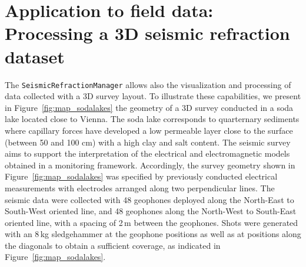 \documentclass[a4paper,fleqn]{cas-sc}
\begin{document}

\section{Application to field data: Processing a 3D seismic refraction dataset}

The \texttt{SeismicRefractionManager} allows also the visualization and processing of data collected with a 3D survey layout. To illustrate these capabilities, we present in Figure~\ref{fig:map_sodalakes} the geometry of a 3D survey conducted in a soda lake located close to Vienna. The soda lake corresponds to quarternary sediments where capillary forces have developed a low permeable layer close to the surface (between 50 and 100 cm) with a high clay and salt content.
The seismic survey aims to support the interpretation of the electrical and electromagnetic models obtained in a monitoring framework. 
Accordingly, the survey geometry shown in Figure~\ref{fig:map_sodalakes} was specified by previously conducted electrical measurements with electrodes arranged along two perpendicular lines. The seismic data were collected with 48 geophones deployed along the North-East to South-West oriented line, and 48 geophones along the North-West to South-East oriented line, with a spacing of 2\,m between the geophones. Shots were generated with an 8\,kg sledgehammer at the geophone positions as well as at positions along the diagonals to obtain a sufficient coverage, as indicated in Figure~\ref{fig:map_sodalakes}.
\end{document}
